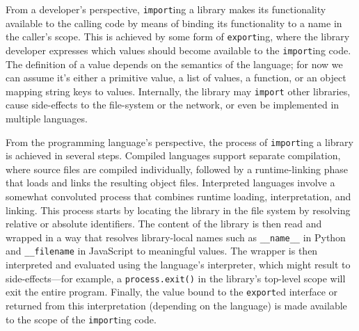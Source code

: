 \documentclass[letterpaper,twocolumn,10pt]{article}
\newcommand{\ttt}[1]{\texttt{#1}}
\newcommand{\fixme}[1]{{\color{red}#1}}
\begin{document}
From a developer's perspective, \ttt{import}ing a library makes its functionality available to the calling code by means of binding its functionality to a name in the caller's scope.
This is achieved by some form of \ttt{export}ing, where the library developer expresses which values should become available to the \ttt{import}ing code.
The definition of a value depends on the semantics of the language; for now we can assume it's either a primitive value, a list of values, a function, or an object mapping string keys to values.
Internally, the library may \ttt{import} other libraries, cause side-effects to the file-system or the network, or even be implemented in multiple languages.

From the programming language's perspective, the process of \ttt{import}ing a library is achieved in several steps. 
Compiled languages support separate compilation, where source files are compiled individually, followed by a runtime-linking phase that loads and links the resulting object files.
Interpreted languages involve a somewhat convoluted process that combines runtime loading, interpretation, and linking.
This process starts by locating the library in the file system %
by resolving relative or absolute identifiers.
The content of the library is then read and wrapped in a way that resolves library-local names such as \ttt{\_\_name\_\_} in Python and \ttt{\_\_filename} in JavaScript to meaningful values.
The wrapper is then interpreted and evaluated using the language's interpreter, which might result to side-effects---for example, a \ttt{process.exit()} in the library's top-level scope will exit the entire program.
Finally, the value bound to the \ttt{export}ed interface or returned from this interpretation (depending on the language) is made available to the scope of the  \ttt{import}ing code.
\end{document}
